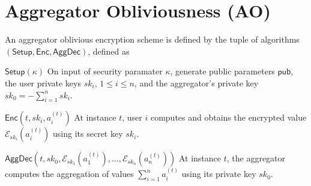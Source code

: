 \documentclass[10pt,letterpaper,oneside,twocolumn,journal]{IEEEtran}
\theoremstyle{definition}
\theoremstyle{definition}
\theoremstyle{remark}
\newcommand\shrtdots{\!...}
\begin{document}
\section{Aggregator Obliviousness (AO)} \label{app:ao}
An aggregator oblivious encryption scheme is defined by the tuple of algorithms $(\mathsf{Setup}, \mathsf{Enc}, \mathsf{AggDec})$, defined as
\begin{LaTeXdescription}
    \item[$\mathsf{Setup}(\kappa)$] On input of security paramater $\kappa$, generate public parameters $\mathsf{pub}$, the user private keys $sk_i,\,1\leq i \leq n$, and the aggregator's private key $sk_0=-\sum^n_{i=1}sk_i$.
    \item[$\mathsf{Enc}(t, sk_i, a^{(t)}_i)$] At instance $t$, user $i$ computes and obtains the encrypted value $\mathcal{E}_{sk_i}(a^{(t)}_i)$ using its secret key $sk_i$.
    \item[$\mathsf{AggDec}(t, sk_0, \mathcal{E}_{sk_1}(a^{(t)}_1),\shrtdots,\mathcal{E}_{sk_n}(a^{(t)}_n))$] At instance $t$, the aggregator computes the aggregation of values $\sum^{n}_{i=1} a^{(t)}_i$ using its private key $sk_0$.
\end{LaTeXdescription}
\end{document}
